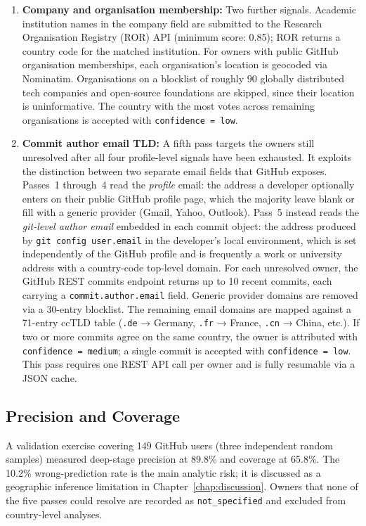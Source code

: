 \begin{enumerate}
  \item \textbf{Company and organisation membership:} Two further signals. Academic institution names in the company field are submitted to the Research Organisation Registry (ROR) API (minimum score: 0.85); ROR returns a country code for the matched institution. For owners with public GitHub organisation memberships, each organisation's location is geocoded via Nominatim. Organisations on a blocklist of roughly 90 globally distributed tech companies and open-source foundations are skipped, since their location is uninformative. The country with the most votes across remaining organisations is accepted with \texttt{confidence = low}.

  \item \textbf{Commit author email TLD:} A fifth pass targets the owners still unresolved after all four profile-level signals have been exhausted. It exploits the distinction between two separate email fields that GitHub exposes. Passes~1 through~4 read the \emph{profile} email: the address a developer optionally enters on their public GitHub profile page, which the majority leave blank or fill with a generic provider (Gmail, Yahoo, Outlook). Pass~5 instead reads the \emph{git-level author email} embedded in each commit object: the address produced by \texttt{git config user.email} in the developer's local environment, which is set independently of the GitHub profile and is frequently a work or university address with a country-code top-level domain. For each unresolved owner, the GitHub REST commits endpoint returns up to 10 recent commits, each carrying a \texttt{commit.author.email} field. Generic provider domains are removed via a 30-entry blocklist. The remaining email domains are mapped against a 71-entry ccTLD table (\texttt{.de} → Germany, \texttt{.fr} → France, \texttt{.cn} → China, etc.). If two or more commits agree on the same country, the owner is attributed with \texttt{confidence = medium}; a single commit is accepted with \texttt{confidence = low}. This pass requires one REST API call per owner and is fully resumable via a JSON cache.
\end{enumerate}

\subsection{Precision and Coverage}

A validation exercise covering 149 GitHub users (three independent random samples) measured deep-stage precision at 89.8\% and coverage at 65.8\%. The 10.2\% wrong-prediction rate is the main analytic risk; it is discussed as a geographic inference limitation in Chapter~\ref{chap:discussion}. Owners that none of the five passes could resolve are recorded as \texttt{not\_specified} and excluded from country-level analyses.

